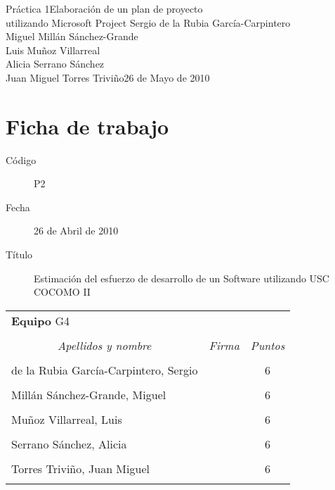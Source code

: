 \documentclass[11pt,a4paper,spanish,twoside]{book}
\begin{document}


{Práctica 1}{Elaboración de un plan de proyecto\\utilizando Microsoft Project}
{Sergio de la Rubia García-Carpintero\\Miguel Millán Sánchez-Grande\\
  Luis Muñoz Villarreal\\Alicia Serrano Sánchez\\
  Juan Miguel Torres Triviño}{26 de Mayo de 2010}


\chapter*{Ficha de trabajo}
\begin{description}
\item[Código] P2
\item[Fecha] 26 de Abril de 2010
\item[Título] Estimación del esfuerzo de desarrollo de un Software utilizando
USC COCOMO II
\end{description}

\begin{table}[!ht]
  \centering
  \begin{tabular}{lp{5cm}c}
    \multicolumn{3}{l}{\Large \textbf{Equipo} G4} \\ \\
    \multicolumn{1}{c}{\emph{Apellidos y nombre}} & 
    \multicolumn{1}{c}{\emph{Firma}} & \emph{Puntos} \\
    \hline \\
    de la Rubia García-Carpintero, Sergio & & 6 \\ \\
    Millán Sánchez-Grande, Miguel         & & 6 \\ \\
    Muñoz Villarreal, Luis                & & 6 \\ \\
    Serrano Sánchez, Alicia               & & 6 \\ \\
    Torres Triviño, Juan Miguel           & & 6 \\ \\
    \hline
  \end{tabular}
\end{table}
\end{document}
